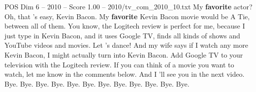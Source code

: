 \begin{textsample}{POS Dim 6 – 2010 – Score 1.00 – 2010/tv\_com\_2010\_10.txt}  \label{ex:f6_pos_068}
My \textbf{favorite} actor?
Oh, that 's easy, Kevin Bacon.
My \textbf{favorite} Kevin Bacon movie would be A Tie, between all of them.
You know, the Logitech review is perfect for me, because I just type in Kevin Bacon, and it uses Google TV, finds all kinds of shows and YouTube videos and movies.
Let 's dance!
And my wife says if I watch any more Kevin Bacon, I might actually turn into Kevin Bacon.
Add Google TV to your television with the Logitech review.
If you can think of a movie you want to watch, let me know in the comments below.
And I 'll see you in the next video.
Bye.
Bye.
Bye.
Bye.
Bye.
Bye.
Bye.
Bye.
Bye.
Bye.
Bye.
Bye.

\end{textsample}
